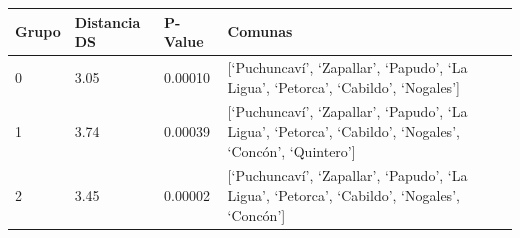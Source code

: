 \documentclass[]{article}
\begin{document}
\begin{longtable}[]{@{}llll@{}}
\toprule
\begin{minipage}[b]{0.22\columnwidth}\raggedright
Grupo\strut
\end{minipage} & \begin{minipage}[b]{0.22\columnwidth}\raggedright
Distancia DS\strut
\end{minipage} & \begin{minipage}[b]{0.22\columnwidth}\raggedright
P-Value\strut
\end{minipage} & \begin{minipage}[b]{0.22\columnwidth}\raggedright
Comunas\strut
\end{minipage}\tabularnewline
\midrule
\endhead
\begin{minipage}[t]{0.22\columnwidth}\raggedright
0\strut
\end{minipage} & \begin{minipage}[t]{0.22\columnwidth}\raggedright
3.05\strut
\end{minipage} & \begin{minipage}[t]{0.22\columnwidth}\raggedright
0.00010\strut
\end{minipage} & \begin{minipage}[t]{0.22\columnwidth}\raggedright
{[}`Puchuncaví', `Zapallar', `Papudo', `La Ligua', `Petorca', `Cabildo',
`Nogales'{]}\strut
\end{minipage}\tabularnewline
\begin{minipage}[t]{0.22\columnwidth}\raggedright
1\strut
\end{minipage} & \begin{minipage}[t]{0.22\columnwidth}\raggedright
3.74\strut
\end{minipage} & \begin{minipage}[t]{0.22\columnwidth}\raggedright
0.00039\strut
\end{minipage} & \begin{minipage}[t]{0.22\columnwidth}\raggedright
{[}`Puchuncaví', `Zapallar', `Papudo', `La Ligua', `Petorca', `Cabildo',
`Nogales', `Concón', `Quintero'{]}\strut
\end{minipage}\tabularnewline
\begin{minipage}[t]{0.22\columnwidth}\raggedright
2\strut
\end{minipage} & \begin{minipage}[t]{0.22\columnwidth}\raggedright
3.45\strut
\end{minipage} & \begin{minipage}[t]{0.22\columnwidth}\raggedright
0.00002\strut
\end{minipage} & \begin{minipage}[t]{0.22\columnwidth}\raggedright
{[}`Puchuncaví', `Zapallar', `Papudo', `La Ligua', `Petorca', `Cabildo',
`Nogales', `Concón'{]}\strut
\end{minipage}\tabularnewline
\bottomrule
\end{longtable}
\end{document}

